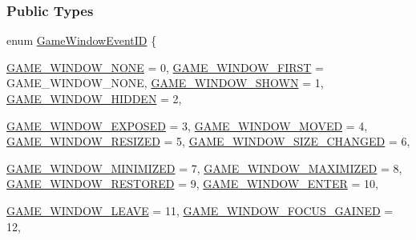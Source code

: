 \subsubsection*{Public Types}
\begin{DoxyCompactItemize}
\item 
enum \hyperlink{classMezzanine_1_1EventGameWindow_a0f0ff29853317334f018bcf48d502af2}{GameWindowEventID} \{ \par
\hyperlink{classMezzanine_1_1EventGameWindow_a0f0ff29853317334f018bcf48d502af2a892269bc048c1f0049d8b812da24bd53}{GAME\_\-WINDOW\_\-NONE} = 0, 
\hyperlink{classMezzanine_1_1EventGameWindow_a0f0ff29853317334f018bcf48d502af2a3a18d47a742d53b085ab8e9fc7a54895}{GAME\_\-WINDOW\_\-FIRST} =  GAME\_\-WINDOW\_\-NONE, 
\hyperlink{classMezzanine_1_1EventGameWindow_a0f0ff29853317334f018bcf48d502af2aa89066b0378529a05a65e6873ca402d1}{GAME\_\-WINDOW\_\-SHOWN} =  1, 
\hyperlink{classMezzanine_1_1EventGameWindow_a0f0ff29853317334f018bcf48d502af2a37c7d5b4d0e1a475d5ce3fb349a301a7}{GAME\_\-WINDOW\_\-HIDDEN} =  2, 
\par
\hyperlink{classMezzanine_1_1EventGameWindow_a0f0ff29853317334f018bcf48d502af2a8964328b582a9db0df814dd385fd93fb}{GAME\_\-WINDOW\_\-EXPOSED} =  3, 
\hyperlink{classMezzanine_1_1EventGameWindow_a0f0ff29853317334f018bcf48d502af2a0737c3b12ec648cee8ce44ed93c10064}{GAME\_\-WINDOW\_\-MOVED} =  4, 
\hyperlink{classMezzanine_1_1EventGameWindow_a0f0ff29853317334f018bcf48d502af2aa7255db1e6f3173f9368c3a2dcaab857}{GAME\_\-WINDOW\_\-RESIZED} =  5, 
\hyperlink{classMezzanine_1_1EventGameWindow_a0f0ff29853317334f018bcf48d502af2aa5ea0a38767bad184a886284fb202afb}{GAME\_\-WINDOW\_\-SIZE\_\-CHANGED} =  6, 
\par
\hyperlink{classMezzanine_1_1EventGameWindow_a0f0ff29853317334f018bcf48d502af2a17e8093e3c905a1636a380153bd1a6ef}{GAME\_\-WINDOW\_\-MINIMIZED} =  7, 
\hyperlink{classMezzanine_1_1EventGameWindow_a0f0ff29853317334f018bcf48d502af2afc31ceecd15a156e1d8baca2d899aa8a}{GAME\_\-WINDOW\_\-MAXIMIZED} =  8, 
\hyperlink{classMezzanine_1_1EventGameWindow_a0f0ff29853317334f018bcf48d502af2af24d3d62a01ee70de0213d81f75767fe}{GAME\_\-WINDOW\_\-RESTORED} =  9, 
\hyperlink{classMezzanine_1_1EventGameWindow_a0f0ff29853317334f018bcf48d502af2af2909516a47a485d4b00ffdcd851f92a}{GAME\_\-WINDOW\_\-ENTER} =  10, 
\par
\hyperlink{classMezzanine_1_1EventGameWindow_a0f0ff29853317334f018bcf48d502af2a134ddfd78b7c1e685f4325bacabf928d}{GAME\_\-WINDOW\_\-LEAVE} =  11, 
\hyperlink{classMezzanine_1_1EventGameWindow_a0f0ff29853317334f018bcf48d502af2a33458969664c21f536a6aacca470d77d}{GAME\_\-WINDOW\_\-FOCUS\_\-GAINED} =  12, 

\end{DoxyCompactItemize}

